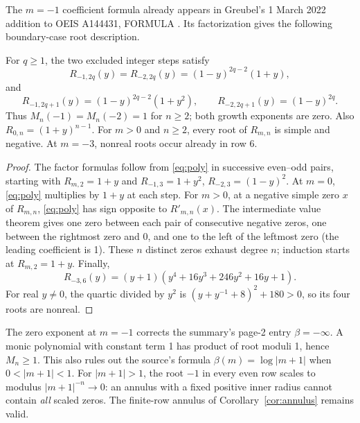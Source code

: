 The $m=-1$ coefficient formula already appears in Greubel's
1 March 2022 addition to OEIS A144431, FORMULA \cite{oeislinked}.
Its factorization gives the following boundary-case root description.
\begin{corollary}\label{cor:boundaryroots}
For $q\geq1$, the two excluded integer steps satisfy
\[
 R_{-1,2q}(y)=R_{-2,2q}(y)=(1-y)^{2q-2}(1+y),
\]
and
\[
 R_{-1,2q+1}(y)=(1-y)^{2q-2}(1+y^2),\qquad
 R_{-2,2q+1}(y)=(1-y)^{2q}.
\]
Thus $M_n(-1)=M_n(-2)=1$ for $n\geq2$; both growth exponents
are zero. Also $R_{0,n}=(1+y)^{n-1}$. For $m>0$ and $n\geq2$,
every root of $R_{m,n}$ is simple and negative. At $m=-3$,
nonreal roots occur already in row 6.
\end{corollary}
\begin{proof}
The factor formulas follow from \eqref{eq:poly} in successive
even--odd pairs, starting with $R_{m,2}=1+y$ and
$R_{-1,3}=1+y^2$, $R_{-2,3}=(1-y)^2$.
At $m=0$, \eqref{eq:poly} multiplies by $1+y$ at each step.
For $m>0$, at a negative simple zero $x$ of $R_{m,n}$,
\eqref{eq:poly} has sign opposite to $R'_{m,n}(x)$.
The intermediate value theorem gives one zero between each pair
of consecutive negative zeros, one between the rightmost zero
and 0, and one to the left of the leftmost zero (the leading
coefficient is 1). These $n$ distinct zeros exhaust degree $n$;
induction starts at $R_{m,2}=1+y$.
Finally,
\[
 R_{-3,6}(y)=(y+1)(y^4+16y^3+246y^2+16y+1).
\]
For real $y\ne0$, the quartic divided by $y^2$ is
$(y+y^{-1}+8)^2+180>0$, so its four roots are nonreal.
\end{proof}
The zero exponent at $m=-1$ corrects the summary's
page-2 entry $\beta=-\infty$. A monic polynomial with constant
term 1 has product of root moduli 1, hence $M_n\geq1$.
This also rules out the source's formula $\beta(m)=\log|m+1|$
when $0<|m+1|<1$. For $|m+1|>1$, the root $-1$ in every
even row scales to modulus $|m+1|^{-n}\to0$: an annulus with a
fixed positive inner radius cannot contain \emph{all} scaled zeros.
The finite-row annulus of Corollary~\ref{cor:annulus} remains valid.
